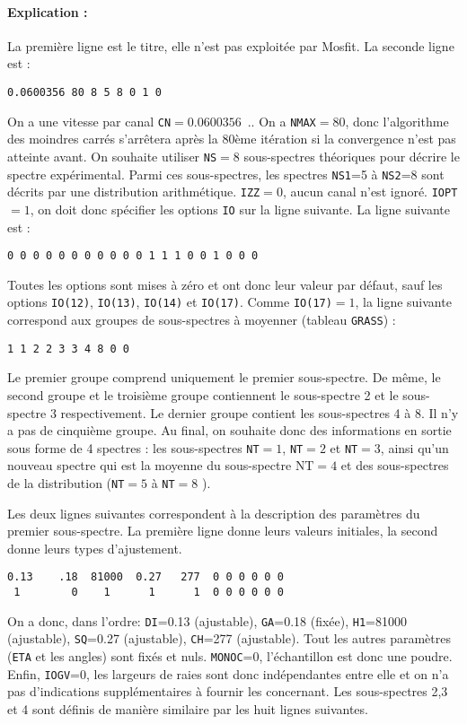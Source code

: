 \paragraph{Explication :}
La première ligne est le titre, elle n'est pas exploitée par Mosfit. 
La seconde ligne est :
\begin{lstlisting}[frame=single]
0.0600356 80 8 5 8 0 1 0
\end{lstlisting}
On a une vitesse par canal \lstinline{CN}$=0.0600356$~\milli\meter.\reciprocal\second.
On a \lstinline{NMAX}$=80$, donc l'algorithme des moindres carrés s'arrêtera après la 80ème itération si la convergence n'est pas atteinte avant.
On souhaite utiliser \lstinline{NS}$=8$ sous-spectres théoriques pour décrire le spectre expérimental.
Parmi ces sous-spectres, les spectres \lstinline{NS1}=5 à \lstinline{NS2}=8 sont décrits par une distribution arithmétique.
\lstinline{IZZ}$=0$, aucun canal n'est ignoré. \lstinline{IOPT}$=1$, on doit donc spécifier les options \lstinline{IO} sur la ligne suivante. La ligne suivante est :
\begin{lstlisting}[frame=single]
0 0 0 0 0 0 0 0 0 0 0 1 1 1 0 0 1 0 0 0
\end{lstlisting}
Toutes les options sont mises à zéro et ont donc leur valeur par défaut, sauf les options \lstinline{IO(12)}, \lstinline{IO(13)}, \lstinline{IO(14)} et \lstinline{IO(17)}.
Comme \lstinline{IO(17)}$=1$, la ligne suivante correspond aux groupes de sous-spectres à moyenner (tableau \lstinline{GRASS}) :
\begin{lstlisting}[frame=single]
1 1 2 2 3 3 4 8 0 0
\end{lstlisting}
Le premier groupe comprend uniquement le premier sous-spectre.
 De même, le second groupe et le troisième groupe contiennent le sous-spectre 2 et le sous-spectre 3 respectivement.
Le dernier groupe contient les sous-spectres 4 à 8. Il n'y a pas de cinquième groupe. 
Au final, on souhaite donc des informations en sortie sous forme de 4 spectres : les sous-spectres \lstinline{NT}$=1$, \lstinline{NT}$=2$  et \lstinline{NT}$=3$,  ainsi qu'un nouveau spectre qui est la moyenne du sous-spectre $\text{NT}=4$  et des sous-spectres de la distribution (\lstinline{NT}$=5$ à \lstinline{NT}$=8$ ).

Les deux lignes suivantes correspondent à la description des paramètres du premier sous-spectre.
La première ligne donne leurs valeurs initiales, la second donne leurs types d'ajustement.
\begin{lstlisting}[frame=single]
0.13    .18  81000  0.27   277  0 0 0 0 0 0 
 1        0    1      1      1  0 0 0 0 0 0
\end{lstlisting}
On a donc, dans l'ordre: \lstinline{DI}=0.13 (ajustable),  \lstinline{GA}=0.18 (fixée), \lstinline{H1}=81000 (ajustable), \lstinline{SQ}=0.27 (ajustable), \lstinline{CH}=277 (ajustable).
 Tout les autres paramètres (\lstinline{ETA} et les angles) sont fixés et nuls.
\lstinline{MONOC}=0, l'échantillon est donc une poudre. Enfin,  \lstinline{IOGV}=0, les largeurs de raies sont donc indépendantes entre elle et on n'a pas d'indications supplémentaires à fournir les concernant.
Les sous-spectres 2,3 et 4 sont définis de manière similaire par les huit lignes suivantes.

